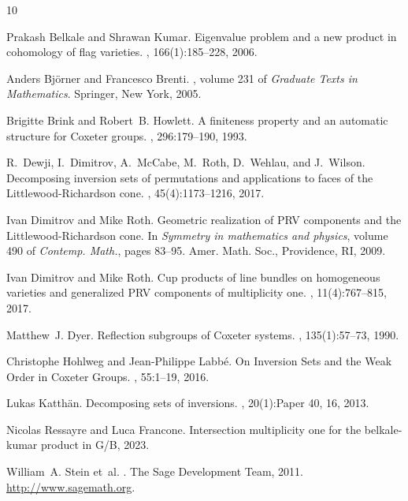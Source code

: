 \documentclass[Unicode]{cedram-alco}
\theoremstyle{definition}
\begin{document}



\begin{thebibliography}{10}

Prakash Belkale and Shrawan Kumar.
\newblock Eigenvalue problem and a new product in cohomology of flag varieties.
, 166(1):185--228, 2006.

Anders Bj\"{o}rner and Francesco Brenti.
, volume 231 of {\em Graduate
  Texts in Mathematics}.
\newblock Springer, New York, 2005.

Brigitte Brink and Robert~B. Howlett.
\newblock A finiteness property and an automatic structure for {C}oxeter
  groups.
, 296:179--190, 1993.

R.~Dewji, I.~Dimitrov, A.~McCabe, M.~Roth, D.~Wehlau, and J.~Wilson.
\newblock Decomposing inversion sets of permutations and applications to faces
  of the {L}ittlewood-{R}ichardson cone.
, 45(4):1173--1216, 2017.

Ivan Dimitrov and Mike Roth.
\newblock Geometric realization of {PRV} components and the
  {L}ittlewood-{R}ichardson cone.
\newblock In {\em Symmetry in mathematics and physics}, volume 490 of {\em
  Contemp. Math.}, pages 83--95. Amer. Math. Soc., Providence, RI, 2009.

Ivan Dimitrov and Mike Roth.
\newblock Cup products of line bundles on homogeneous varieties and generalized
  {PRV} components of multiplicity one.
, 11(4):767--815, 2017.

Matthew~J. Dyer.
\newblock Reflection subgroups of {C}oxeter systems.
, 135(1):57--73, 1990.

Christophe Hohlweg and Jean-Philippe Labb\'e.
\newblock On {I}nversion {S}ets and the {W}eak {O}rder in {C}oxeter {G}roups.
, 55:1--19, 2016.

Lukas Katth\"an.
\newblock Decomposing sets of inversions.
, 20(1):Paper 40, 16, 2013.

Nicolas Ressayre and Luca Francone.
\newblock Intersection multiplicity one for the belkale-kumar product in G/B,
  2023.

William~A. Stein et~al.
.
\newblock The Sage Development Team, 2011.
\newblock \url{http://www.sagemath.org}.

\end{thebibliography}
\end{document}
